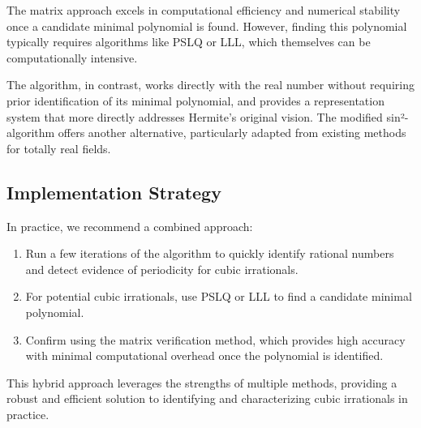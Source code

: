 The matrix approach excels in computational efficiency and numerical stability once a candidate minimal polynomial is found. However, finding this polynomial typically requires algorithms like PSLQ or LLL, which themselves can be computationally intensive.

The \HAPD{} algorithm, in contrast, works directly with the real number without requiring prior identification of its minimal polynomial, and provides a representation system that more directly addresses Hermite's original vision. The modified sin²-algorithm offers another alternative, particularly adapted from existing methods for totally real fields.

\subsection{Implementation Strategy}

In practice, we recommend a combined approach:
\begin{enumerate}
    \item Run a few iterations of the \HAPD{} algorithm to quickly identify rational numbers and detect evidence of periodicity for cubic irrationals.
    \item For potential cubic irrationals, use PSLQ or LLL to find a candidate minimal polynomial.
    \item Confirm using the matrix verification method, which provides high accuracy with minimal computational overhead once the polynomial is identified.
\end{enumerate}

This hybrid approach leverages the strengths of multiple methods, providing a robust and efficient solution to identifying and characterizing cubic irrationals in practice.
